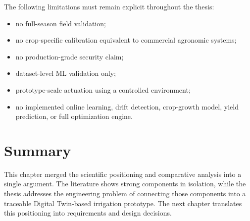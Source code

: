 The following limitations must remain explicit throughout the thesis:

\begin{itemize}
    \item no full-season field validation;
    \item no crop-specific calibration equivalent to commercial agronomic systems;
    \item no production-grade security claim;
    \item dataset-level ML validation only;
    \item prototype-scale actuation using a controlled environment;
    \item no implemented online learning, drift detection, crop-growth model, yield prediction, or full optimization engine.
\end{itemize}

\section{Summary}

This chapter merged the scientific positioning and comparative analysis into a single argument. The literature shows strong components in isolation, while the thesis addresses the engineering problem of connecting those components into a traceable Digital Twin-based irrigation prototype. The next chapter translates this positioning into requirements and design decisions.
